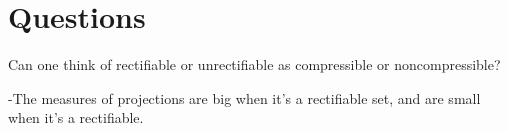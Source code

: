 \chapter{Questions}

Can one think of rectifiable or unrectifiable as compressible or noncompressible?

-The measures of projections are big when it's a rectifiable set, and are small when it's a rectifiable.

